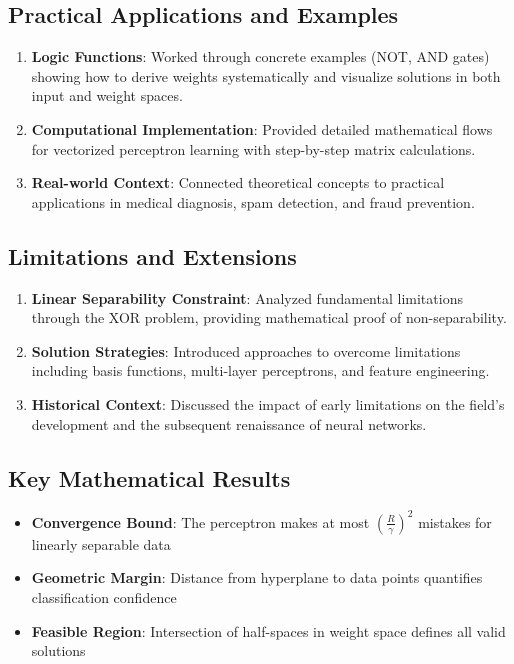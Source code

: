 \subsection{Practical Applications and Examples}
\begin{enumerate}
    \item \textbf{Logic Functions}: Worked through concrete examples (NOT, AND gates) showing how to derive weights systematically and visualize solutions in both input and weight spaces.
    
    \item \textbf{Computational Implementation}: Provided detailed mathematical flows for vectorized perceptron learning with step-by-step matrix calculations.
    
    \item \textbf{Real-world Context}: Connected theoretical concepts to practical applications in medical diagnosis, spam detection, and fraud prevention.
\end{enumerate}

\subsection{Limitations and Extensions}
\begin{enumerate}
    \item \textbf{Linear Separability Constraint}: Analyzed fundamental limitations through the XOR problem, providing mathematical proof of non-separability.
    
    \item \textbf{Solution Strategies}: Introduced approaches to overcome limitations including basis functions, multi-layer perceptrons, and feature engineering.
    
    \item \textbf{Historical Context}: Discussed the impact of early limitations on the field's development and the subsequent renaissance of neural networks.
\end{enumerate}

\subsection{Key Mathematical Results}
\begin{itemize}
    \item \textbf{Convergence Bound}: The perceptron makes at most $\left(\frac{R}{\gamma}\right)^2$ mistakes for linearly separable data
    \item \textbf{Geometric Margin}: Distance from hyperplane to data points quantifies classification confidence
    \item \textbf{Feasible Region}: Intersection of half-spaces in weight space defines all valid solutions
\end{itemize}

